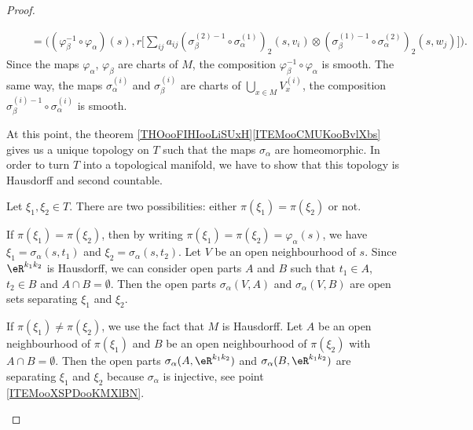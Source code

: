 \begin{proof}
\begin{subproof}
\begin{subproof}
\begin{subequations}
\begin{align}
					 & \quad = \Big( (\varphi_{\beta}^{-1}\circ\varphi_{\alpha})(s),r\big[  \sum_{ij}a_{ij}(\sigma_{\beta}^{(2)-1}\circ\sigma_{\alpha}^{(1)})_2(s,v_i)\otimes (\sigma_{\beta}^{(1)-1}\circ\sigma_{\alpha}^{(2)})_2(s,w_j) \big] \Big).
				\end{align}
			\end{subequations}
			Since the maps \( \varphi_{\alpha}\), \( \varphi_{\beta}\) are charts of \( M\), the composition \( \varphi_{\beta}^{-1}\circ\varphi_{\alpha}\) is smooth. The same way, the maps \( \sigma_{\alpha}^{(i)}\) and \( \sigma_{\beta}^{(i)} \) are charts of \( \bigcup_{x\in M}V_x^{(i)}\), the composition \( \sigma_{\beta}^{(i)-1}\circ \sigma_{\alpha}^(i)\) is smooth.
		\end{subproof}
	\end{subproof}

	At this point, the theorem \ref{THOooFIHIooLiSUxH}\ref{ITEMooCMUKooBvlXbs} gives us a unique topology on \( T\) such that the maps \( \sigma_{\alpha}\) are homeomorphic. In order to turn \( T\) into a topological manifold, we have to show that this topology is Hausdorff and second countable.

	\begin{subproof}

		\spitem[Hausdorff]
		Let \( \xi_1,\xi_2\in T\). There are two possibilities: either \( \pi(\xi_1)=\pi(\xi_2)\) or not.

		If \( \pi(\xi_1)=\pi(\xi_2)\), then by writing \( \pi(\xi_1)=\pi(\xi_2)=\varphi_{\alpha}(s)\), we have \( \xi_1=\sigma_{\alpha}(s,t_1)\) and \( \xi_2=\sigma_{\alpha}(s,t_2)\). Let \( V\) be an open neighbourhood of \( s\). Since \( \eR^{k_1k_2}\) is Hausdorff, we can consider open parts \( A\) and \( B\) such that \( t_1\in A\), \( t_2\in B\) and \( A\cap B=\emptyset\). Then the open parts \( \sigma_{\alpha}(V,A)\) and \( \sigma_{\alpha}(V,B)\) are open sets separating \( \xi_1\) and \( \xi_2\).

		If \( \pi(\xi_1)\neq \pi(\xi_2)\), we use the fact that \( M\) is Hausdorff. Let \( A\) be an open neighbourhood of \( \pi(\xi_1)\) and \( B\) be an open neighbourhood of \( \pi(\xi_2)\) with \( A\cap B=\emptyset\). Then the open parts \( \sigma_{\alpha}(A,\eR^{k_1k_2})\) and \( \sigma_{\alpha}(B,\eR^{k_1k_2})\) are separating \( \xi_1\) and \( \xi_2\) because \(\sigma_{\alpha}   \) is injective, see point \ref{ITEMooXSPDooKMXlBN}.


\end{subproof}
\end{proof}
